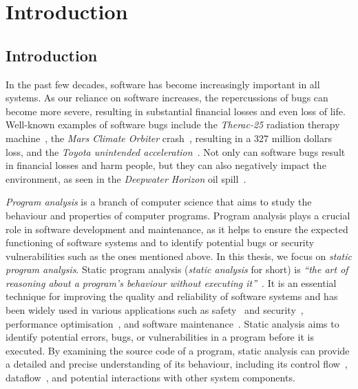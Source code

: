 \chapter{Introduction}
\section{Introduction}
In the past few decades, software has become increasingly important in all systems.
As our reliance on software increases, the repercussions of bugs can become more severe,
resulting in substantial financial losses and even loss of life.
Well-known examples of software bugs include the \emph{Therac-25} radiation therapy machine~\cite{leveson1993investigation},
the \emph{Mars Climate Orbiter} crash~\cite{Sawyer1999}, resulting in a 327 million dollars loss, and the \emph{Toyota unintended acceleration}~\cite{kane2010toyota}.
Not only can software bugs result in financial losses and harm people, but they can also negatively impact the environment,
as seen in the \emph{Deepwater Horizon} oil spill~\cite{Shafer2010Oil}.

\emph{Program analysis} is a branch of computer science that aims to study the behaviour
and properties of computer programs. Program analysis plays a crucial role in software
development and maintenance, as it helps to ensure the expected functioning of software
systems and to identify potential bugs or security vulnerabilities such as the ones mentioned above.
In this thesis, we focus on \emph{static program analysis}.
Static program analysis (\emph{static analysis} for short) is
\emph{``the art of reasoning about a program's behaviour without executing it''}~\cite{spa}.
It is an essential technique for improving the quality and reliability of software
systems and has been widely used in various applications such
as safety~\cite{cousot2005astree,Blanchet2002} and security~\cite{piskachev2021secucheck,flowDroid,ayewah2008using,Sayar_2022,fink2012wala},
performance optimisation~\cite{aho2007compilers,appel2004modern}, and software maintenance~\cite{DuBose2012ReconcilingMA}.
Static analysis aims to identify potential errors, bugs, or vulnerabilities
in a program before it is executed.
By examining the source code of a program, static
analysis can provide a detailed and precise understanding of its behaviour, including
its control flow~\cite{allen1970control}, dataflow~\cite{kam1977monotone},
and potential interactions with other system components.




